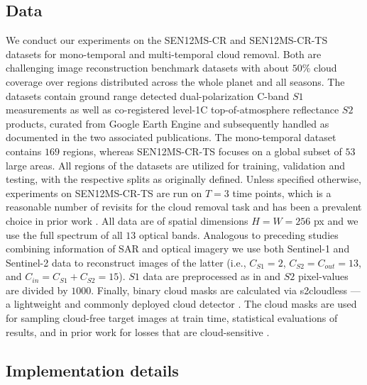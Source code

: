 \documentclass[10pt,twocolumn,letterpaper]{article}
\begin{document}
\subsection{Data} \label{sub:data}
We conduct our experiments on the SEN12MS-CR \cite{ebel2020multisensor} and SEN12MS-CR-TS \cite{ebel2022sen12ms} datasets for mono-temporal and multi-temporal cloud removal. Both are challenging image reconstruction benchmark datasets with about $50 \%$ cloud coverage over regions distributed across the whole planet and all seasons. The datasets contain ground range detected dual-polarization C-band $S1$ measurements as well as co-registered level-1C top-of-atmosphere reflectance $S2$ products, curated from Google Earth Engine \cite{gorelick2017google} and subsequently handled as documented in the two associated publications. 
The mono-temporal dataset contains $169$ regions, whereas SEN12MS-CR-TS focuses on a global subset of $53$ large areas. All regions of the datasets are utilized for training, validation and testing, with the respective splits as originally defined. Unless specified otherwise, experiments on SEN12MS-CR-TS are run on $T=3$ time points, which is a reasonable number of revisits for the cloud removal task and has been a prevalent choice in prior work \cite{Sarukkai_Jain_Uzkent_Ermon_2019, ebel2022sen12ms, sebastianelli2022plfm}. All data are of spatial dimensions $H=W=256$ px and we use the full spectrum of all $13$ optical bands. Analogous to preceding studies combining information of SAR and optical imagery \cite{eckardt2013removal, huang2015sar, meraner2020cloud, ebel2022sen12ms, xu2022glf} we use both Sentinel-1 and Sentinel-2 data to reconstruct images of the latter (i.e., $C_{S1}=2$, $C_{S2}=C_{out}=13$, and $C_{in}=C_{S1}+C_{S2}=15$). 
$S1$ data are preprocessed as in \cite{ebel2020multisensor, ebel2022sen12ms} and $S2$ pixel-values are divided by $1000$. 
Finally, binary cloud masks are calculated via s2cloudless \cite{Zupanc}---a lightweight and commonly deployed cloud detector \cite{s2cloudlessGEE, skakun2022cloud}. The cloud masks are used for sampling cloud-free target images at train time, statistical evaluations of results, and in prior work for losses that are cloud-sensitive \cite{meraner2020cloud}.



\subsection{Implementation details}
\end{document}
